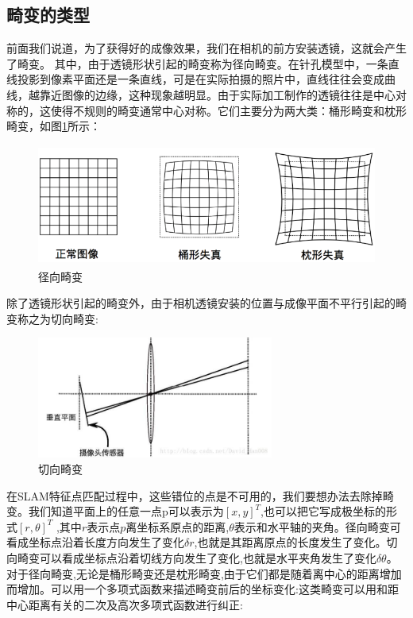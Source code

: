 \subsection{畸变的类型}
前面我们说道，为了获得好的成像效果，我们在相机的前方安装透镜，这就会产生了畸变。
其中，由于透镜形状引起的畸变称为径向畸变。在针孔模型中，一条直线投影到像素平面还是一条直线，可是在实际拍摄的照片中，直线往往会变成曲线，越靠近图像的边缘，这种现象越明显。由于实际加工制作的透镜往往是中心对称的，这使得不规则的畸变通常中心对称。它们主要分为两大类：桶形畸变和枕形畸变，如图\ref{jingxiangjibian}所示：
\begin{figure}
	\centering
	\includegraphics[height=4cm]{figures/jibian.png}
	\caption{径向畸变}\label{jingxiangjibian}
\end{figure}\par
除了透镜形状引起的畸变外，由于相机透镜安装的位置与成像平面不平行引起的畸变称之为切向畸变:
\begin{figure}
	\centering
	\includegraphics[height=4cm]{figures/qiexiangjibian.jpg}
	\caption{切向畸变}\label{qiexiangjibian}
\end{figure}\par
在SLAM特征点匹配过程中，这些错位的点是不可用的，我们要想办法去除掉畸变。我们知道平面上的任意一点p可以表示为$[x,y]^T$,也可以把它写成极坐标的形式$[r,\theta]^T$ ,其中$r$表示点$p$离坐标系原点的距离,$\theta$表示和水平轴的夹角。径向畸变可看成坐标点沿着长度方向发生了变化$\delta r$,也就是其距离原点的长度发生了变化。切向畸变可以看成坐标点沿着切线方向发生了变化,也就是水平夹角发生了变化$\delta \theta$。对于径向畸变,无论是桶形畸变还是枕形畸变,由于它们都是随着离中心的距离增加而增加。可以用一个多项式函数来描述畸变前后的坐标变化:这类畸变可以用和距中心距离有关的二次及高次多项式函数进行纠正:
